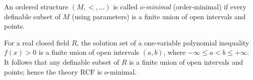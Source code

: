 An ordered structure $(M, <, \ldots)$ is called \emph{$o$-minimal} (order-minimal) if every definable subset of $M$ (using parameters) is a finite union of open intervals and points.

For a real closed field $R$, the solution set of a one-variable polynomial inequality $f(x) > 0$ is a finite union of open intervals $(a, b)$, where $-\infty \leq a < b \leq +\infty$. It follows that any definable subset of $R$ is a finite union of open intervals and points; hence the theory $\text{RCF}$ is $o$-minimal.
